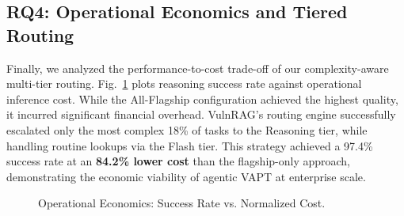 \subsection{RQ4: Operational Economics and Tiered Routing}
Finally, we analyzed the performance-to-cost trade-off of our complexity-aware multi-tier routing. Fig.~\ref{fig:economics} plots reasoning success rate against operational inference cost. While the All-Flagship configuration achieved the highest quality, it incurred significant financial overhead. VulnRAG’s routing engine successfully escalated only the most complex 18\% of tasks to the Reasoning tier, while handling routine lookups via the Flash tier. This strategy achieved a 97.4\% success rate at an \textbf{84.2\% lower cost} than the flagship-only approach, demonstrating the economic viability of agentic VAPT at enterprise scale.

\begin{figure}[htbp]
    \centering
    \resizebox{\columnwidth}{!}{}
    \caption{Operational Economics: Success Rate vs. Normalized Cost.}
    \label{fig:economics}
\end{figure}
